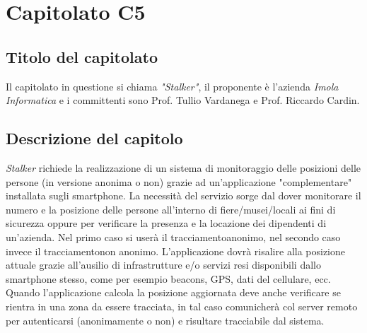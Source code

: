 \section{Capitolato C5}
\subsection{Titolo del capitolato}
Il capitolato in questione si chiama \textit{"Stalker"}, il proponente \`e l'azienda \textit{Imola Informatica} e i committenti sono Prof. Tullio Vardanega e Prof. Riccardo Cardin.

\subsection{Descrizione del capitolo}
\textit{Stalker} richiede la realizzazione di un sistema di monitoraggio delle posizioni delle persone (in versione anonima o non) grazie ad un'applicazione "complementare" installata sugli smartphone. La necessità del servizio sorge dal dover monitorare il numero e la posizione delle persone all'interno di fiere/musei/locali ai fini di sicurezza oppure per verificare la presenza e la locazione dei dipendenti di un'azienda. Nel primo caso si user\`a il tracciamentoanonimo, nel secondo caso invece il tracciamentonon anonimo. L'applicazione dovr\`a risalire alla posizione attuale grazie all'ausilio di infrastrutture e/o servizi resi disponibili dallo smartphone stesso, come per esempio beacons, GPS, dati del cellulare, ecc. Quando l'applicazione calcola la posizione aggiornata deve anche verificare se rientra in una zona da essere tracciata, in tal caso comunicherà col server remoto per autenticarsi (anonimamente o non) e risultare tracciabile dal sistema.

